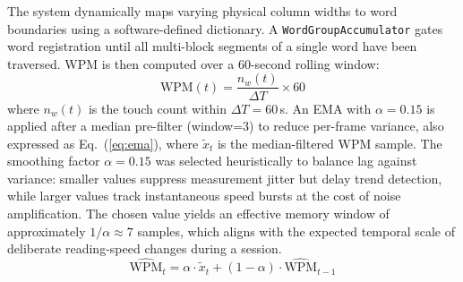 \documentclass[conference]{IEEEtran}
\begin{document}

    The system dynamically maps varying physical column widths to word boundaries using a software-defined dictionary. A \texttt{WordGroupAccumulator} gates word registration until all multi-block segments of a single word have been traversed. WPM is then computed over a 60-second rolling window:
    \begin{equation}
        \text{WPM}(t) = \frac{n_w(t)}{\Delta T} \times 60
        \label{eq:wpm}
    \end{equation}
    where $n_w(t)$ is the touch count within $\Delta T = 60$\,s. An EMA
    with $\alpha = 0.15$ is applied after a median pre-filter (window=3)
    to reduce per-frame variance, also expressed as Eq.~(\ref{eq:ema}),
    where $\tilde{x}_t$ is the median-filtered WPM sample. The smoothing
    factor $\alpha = 0.15$ was selected heuristically to balance lag
    against variance: smaller values suppress measurement jitter but
    delay trend detection, while larger values track instantaneous speed
    bursts at the cost of noise amplification. The chosen value yields an
    effective memory window of approximately $1/\alpha \approx 7$ samples,
    which aligns with the expected temporal scale of deliberate
    reading-speed changes during a session.
    \begin{equation}
        \widehat{\text{WPM}}_t = \alpha \cdot \tilde{x}_t
        + (1-\alpha)\cdot\widehat{\text{WPM}}_{t-1}
        \label{eq:ema}
    \end{equation}

\end{document}
